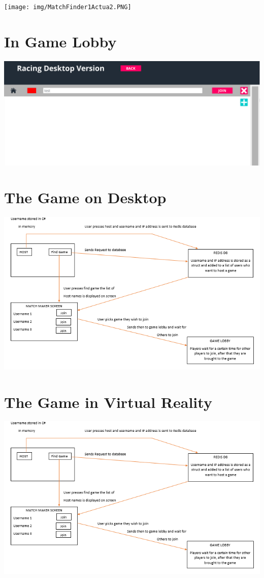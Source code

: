 \texttt{[image: img/MatchFinder1Actua2.PNG]}

\section{In Game Lobby}

\includegraphics[width=1\columnwidth]{img/LobbyActual.PNG}

\section{The Game on Desktop}

\includegraphics[width=1\columnwidth]{img/redisMatch.PNG}

\section{The Game in Virtual Reality}

\includegraphics[width=1\columnwidth]{img/redisMatch.PNG}

